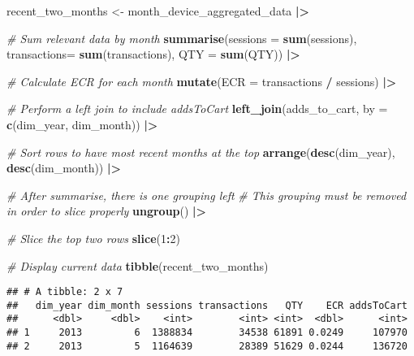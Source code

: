 \documentclass[
]{article}
\newenvironment{Shaded}{\begin{snugshade}}{\end{snugshade}}
\newcommand{\AttributeTok}[1]{\textcolor[rgb]{0.13,0.29,0.53}{#1}}
\newcommand{\CommentTok}[1]{\textcolor[rgb]{0.56,0.35,0.01}{\textit{#1}}}
\newcommand{\DecValTok}[1]{\textcolor[rgb]{0.00,0.00,0.81}{#1}}
\newcommand{\FunctionTok}[1]{\textcolor[rgb]{0.13,0.29,0.53}{\textbf{#1}}}
\newcommand{\NormalTok}[1]{#1}
\newcommand{\OtherTok}[1]{\textcolor[rgb]{0.56,0.35,0.01}{#1}}
\newcommand{\SpecialCharTok}[1]{\textcolor[rgb]{0.81,0.36,0.00}{\textbf{#1}}}
\newcommand{\StringTok}[1]{\textcolor[rgb]{0.31,0.60,0.02}{#1}}
\begin{document}
\begin{Shaded}
\begin{Highlighting}[]
\NormalTok{recent\_two\_months }\OtherTok{\textless{}{-}}\NormalTok{ month\_device\_aggregated\_data }\SpecialCharTok{|\textgreater{}}
  
  \CommentTok{\# Sum relevant data by month}
  \FunctionTok{summarise}\NormalTok{(}\AttributeTok{sessions =} \FunctionTok{sum}\NormalTok{(sessions),}
            \AttributeTok{transactions=} \FunctionTok{sum}\NormalTok{(transactions),}
            \AttributeTok{QTY =} \FunctionTok{sum}\NormalTok{(QTY)) }\SpecialCharTok{|\textgreater{}}
  
  \CommentTok{\# Calculate ECR for each month}
  \FunctionTok{mutate}\NormalTok{(}\AttributeTok{ECR =}\NormalTok{ transactions }\SpecialCharTok{/}\NormalTok{ sessions) }\SpecialCharTok{|\textgreater{}}
  
  \CommentTok{\# Perform a left join to include \textasciigrave{}addsToCart\textasciigrave{}}
  \FunctionTok{left\_join}\NormalTok{(adds\_to\_cart, }\AttributeTok{by =} \FunctionTok{c}\NormalTok{(}\StringTok{\textquotesingle{}dim\_year\textquotesingle{}}\NormalTok{, }\StringTok{\textquotesingle{}dim\_month\textquotesingle{}}\NormalTok{)) }\SpecialCharTok{|\textgreater{}}
  
  \CommentTok{\# Sort rows to have most recent months at the top}
  \FunctionTok{arrange}\NormalTok{(}\FunctionTok{desc}\NormalTok{(dim\_year), }\FunctionTok{desc}\NormalTok{(dim\_month)) }\SpecialCharTok{|\textgreater{}}
  
  \CommentTok{\# After \textasciigrave{}summarise\textasciigrave{}, there is one grouping left}
  \CommentTok{\# This grouping must be removed in order to slice properly}
  \FunctionTok{ungroup}\NormalTok{() }\SpecialCharTok{|\textgreater{}}
  
  \CommentTok{\# Slice the top two rows}
  \FunctionTok{slice}\NormalTok{(}\DecValTok{1}\SpecialCharTok{:}\DecValTok{2}\NormalTok{)}

\CommentTok{\# Display current data}
\FunctionTok{tibble}\NormalTok{(recent\_two\_months)}
\end{Highlighting}
\end{Shaded}

\begin{verbatim}
## # A tibble: 2 x 7
##   dim_year dim_month sessions transactions   QTY    ECR addsToCart
##      <dbl>     <dbl>    <int>        <int> <int>  <dbl>      <int>
## 1     2013         6  1388834        34538 61891 0.0249     107970
## 2     2013         5  1164639        28389 51629 0.0244     136720
\end{verbatim}
\end{document}
